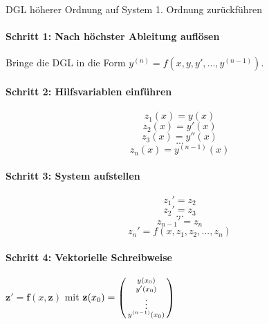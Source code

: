 \begin{KR}{DGL höherer Ordnung auf System 1. Ordnung zurückführen}
\paragraph{Schritt 1: Nach höchster Ableitung auflösen}
Bringe die DGL in die Form $y^{(n)} = f(x, y, y', ..., y^{(n-1)})$.
\vspace{2mm}\\
\begin{minipage}{0.45\linewidth}
\paragraph{Schritt 2: Hilfsvariablen einführen}
\vspace{-3mm}
$$z_1(x) = y(x)$$
$$z_2(x) = y'(x)$$
$$z_3(x) = y''(x)$$
$$...$$
$$z_n(x) = y^{(n-1)}(x)$$
\end{minipage}
\hspace{2mm}
\begin{minipage}{0.5\linewidth}
\paragraph{Schritt 3: System aufstellen}
\vspace{-3mm}
$$z_1' = z_2$$
$$z_2' = z_3$$
$$...$$
$$z_{n-1}' = z_n$$
$$z_n' = f(x, z_1, z_2, ..., z_n)$$
\end{minipage}

\paragraph{Schritt 4: Vektorielle Schreibweise}
$\mathbf{z}' = \mathbf{f}(x, \mathbf{z})$ mit $\mathbf{z}(x_0) = \begin{psmallmatrix} y(x_0) \\ y'(x_0) \\ \vdots \\ y^{(n-1)}(x_0) \end{psmallmatrix}$
\end{KR}

